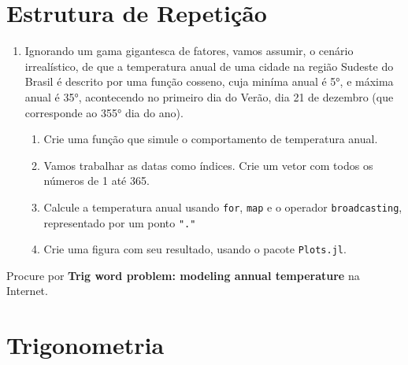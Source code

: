 \documentclass[
  letterpaper,
  DIV=11,
  numbers=noendperiod]{scrreprt}
\begin{document}
\hypertarget{estrutura-de-repetiuxe7uxe3o}{%
\section{Estrutura de Repetição}\label{estrutura-de-repetiuxe7uxe3o}}

\begin{enumerate}
\def\labelenumi{\arabic{enumi}.}
\setcounter{enumi}{2}
\item
  Ignorando um gama gigantesca de fatores, vamos assumir, o cenário
  irrealístico, de que a temperatura anual de uma cidade na região
  Sudeste do Brasil é descrito por uma função cosseno, cuja miníma anual
  é 5°, e máxima anual é 35°, acontecendo no primeiro dia do Verão, dia
  21 de dezembro (que corresponde ao 355° dia do ano).

  \begin{enumerate}
  \def\labelenumii{\alph{enumii}.}
  \item
    Crie uma função que simule o comportamento de temperatura anual.
  \item
    Vamos trabalhar as datas como índices. Crie um vetor com todos os
    números de 1 até 365.
  \item
    Calcule a temperatura anual usando \texttt{for}, \texttt{map} e o
    operador \texttt{broadcasting}, representado por um ponto
    \texttt{"."}
  \item
    Crie uma figura com seu resultado, usando o pacote
    \texttt{Plots.jl}.
  \end{enumerate}
\end{enumerate}

\begin{tcolorbox}[enhanced jigsaw, rightrule=.15mm, title=\textcolor{quarto-callout-tip-color}{\faLightbulb}\hspace{0.5em}{Dica}, colframe=quarto-callout-tip-color-frame, leftrule=.75mm, bottomtitle=1mm, opacitybacktitle=0.6, coltitle=black, arc=.35mm, toptitle=1mm, opacityback=0, bottomrule=.15mm, toprule=.15mm, titlerule=0mm, breakable, colbacktitle=quarto-callout-tip-color!10!white, left=2mm, colback=white]
Procure por \textbf{Trig word problem: modeling annual temperature} na
Internet.
\end{tcolorbox}

\hypertarget{trigonometria}{%
\section{Trigonometria}\label{trigonometria}}
\end{document}
